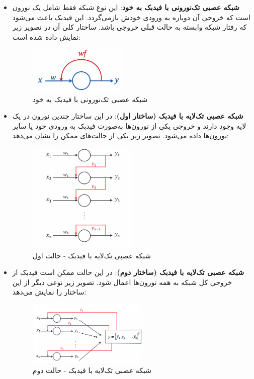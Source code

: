 \begin{enumerate}
	\begin{itemize}
		\item \textbf{شبکه عصبی تک‌نورونی با فیدبک به خود}:  
		این نوع شبکه فقط شامل یک نورون است که خروجی آن دوباره به ورودی خودش بازمی‌گردد. این فیدبک باعث می‌شود که رفتار شبکه وابسته به حالت قبلی خروجی باشد. ساختار کلی آن در تصویر زیر نمایش داده شده است:
		
		\begin{figure}[H]
			\centering
			\includegraphics[width=0.45\textwidth]{tak.png}
			\caption{شبکه عصبی تک‌نورونی با فیدبک به خود}
		\end{figure}
		
		\item \textbf{شبکه عصبی تک‌لایه با فیدبک (ساختار اول)}:  
		در این ساختار چندین نورون در یک لایه وجود دارند و خروجی یکی از نورون‌ها به‌صورت فیدبک به ورودی خود یا سایر نورون‌ها داده می‌شود. تصویر زیر یکی از حالت‌های ممکن را نشان می‌دهد:
		
		\begin{figure}[H]
			\centering
			\includegraphics[width=0.50\textwidth]{tartibi.png}
			\caption{شبکه عصبی تک‌لایه با فیدبک - حالت اول}
		\end{figure}
		
		\item \textbf{شبکه عصبی تک‌لایه با فیدبک (ساختار دوم)}:  
		در این حالت ممکن است فیدبک از خروجی کل شبکه به همه نورون‌ها اعمال شود. تصویر زیر نوعی دیگر از این ساختار را نمایش می‌دهد:
		
		\begin{figure}[H]
			\centering
			\includegraphics[width=0.55\textwidth]{total.png}
			\caption{شبکه عصبی تک‌لایه با فیدبک - حالت دوم}
		\end{figure}
		

\end{itemize}
\end{enumerate}
